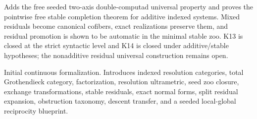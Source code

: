 \documentclass[11pt]{article}
\theoremstyle{definition}
\theoremstyle{remark}
\begin{document}
\begin{description}[leftmargin=8em,style=nextline]
\item[v0.2.0] Adds the free seeded two-axis double-computad universal property and proves the pointwise free stable completion theorem for additive indexed systems. Mixed residuals become canonical cofibers, exact realizations preserve them, and residual promotion is shown to be automatic in the minimal stable zoo. K13 is closed at the strict syntactic level and K14 is closed under additive/stable hypotheses; the nonadditive residual universal construction remains open.
\item[v0.1.0] Initial continuous formalization. Introduces indexed resolution categories, total Grothendieck category, factorization, resolution ultrametric, seed zoo closure, exchange transformations, stable residuals, exact normal forms, split residual expansion, obstruction taxonomy, descent transfer, and a seeded local-global reciprocity blueprint.
\end{description}
\endgroup
\end{document}
